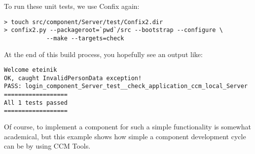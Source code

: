 \vspace{3mm}
To run these unit tests, we use Confix again:
\begin{footnotesize}
\begin{verbatim}
> touch src/component/Server/test/Confix2.dir
> confix2.py --packageroot=`pwd`/src --bootstrap --configure \
            --make --targets=check 
\end{verbatim}
\end{footnotesize}

At the end of this build process, you hopefully see an output like:
\begin{footnotesize}
\begin{verbatim}
Welcome eteinik
OK, caught InvalidPersonData exception!
PASS: login_component_Server_test__check_application_ccm_local_Server
==================
All 1 tests passed
==================
\end{verbatim}
\end{footnotesize}

Of course, to implement a component for such a simple functionality is somewhat
academical, but this example shows how simple a component development cycle can
be by using CCM Tools. 

\newpage

